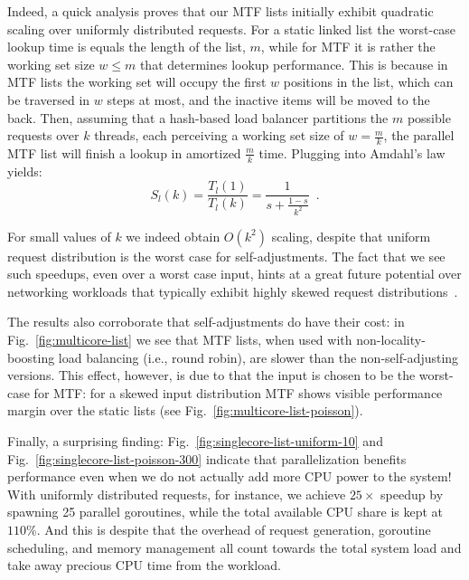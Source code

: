 \documentclass[letterpaper,twocolumn,10pt]{article}
\begin{document}
Indeed, a quick analysis proves that our MTF lists initially exhibit quadratic scaling over uniformly distributed requests. For a static linked list the worst-case lookup time is equals the length of the list, $m$, while for MTF it is rather the working set size $w\le m$ that determines lookup performance. This is because in MTF lists the working set will occupy the first $w$ positions in the list, which can be traversed in $w$ steps at most, and the inactive items will be moved to the back. Then, assuming that a hash-based load balancer partitions the $m$ possible requests over $k$ threads, each perceiving a working set size of $w=\frac{m}{k}$, the parallel MTF list will finish a lookup in amortized $\frac{m}{k}$ time. Plugging into Amdahl's law yields:
\begin{equation}\label{eq:mtf-perf}
  S_l(k) = \frac{T_l(1)}{T_l(k)} = \frac1{s + \frac{1-s}{k^2}} \enspace .
\end{equation}

For small values of $k$ we indeed obtain $O(k^2)$ scaling, despite that uniform request distribution is the worst case for self-adjustments. The fact that we see such speedups, even over a worst case input, hints at a great future potential over networking workloads that typically exhibit highly skewed request distributions~\cite{832484}.

The results also corroborate that self-adjustments do have their cost: in Fig.~\ref{fig:multicore-list} we see that MTF lists, when used with non-locality-boosting load balancing (i.e., round robin), are slower than the non-self-adjusting versions.  This effect, however, is due to that the input is chosen to be the worst-case for MTF: for a skewed input distribution MTF shows visible performance margin over the static lists (see Fig.~\ref{fig:multicore-list-poisson}).

Finally, a surprising finding: Fig.~\ref{fig:singlecore-list-uniform-10} and Fig.~\ref{fig:singlecore-list-poisson-300} indicate that parallelization benefits performance even when we do not actually add more CPU power to the system! With uniformly distributed requests, for instance, we achieve $25\times$ speedup by spawning 25 parallel goroutines, while the total available CPU share is kept at $110$\%. %
And this is despite that the overhead of request generation, goroutine scheduling, and memory management all count towards the total system load and take away precious CPU time from the workload.
\end{document}
